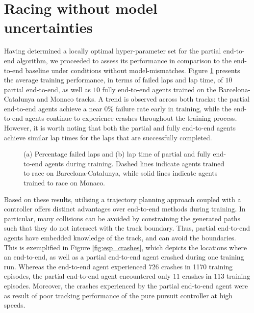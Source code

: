 \section{Racing without model uncertainties}

Having determined a locally optimal hyper-parameter set for the partial end-to-end algorithm, we proceeded to assess its performance in comparison to the end-to-end baseline under conditions without model-mismatches. 
Figure \ref{fig:all_tracks_train} presents the average training performance, in terms of failed laps and lap time, of $10$ partial end-to-end, as well as $10$ fully end-to-end agents trained on the Barcelona-Catalunya and Monaco tracks. 
A trend is observed across both tracks: the partial end-to-end agents achieve a near $0\%$ failure rate early in training, while the end-to-end agents continue to experience crashes throughout the training process.
However, it is worth noting that both the partial and fully end-to-end agents achieve similar lap times for the laps that are successfully completed. 

\begin{figure}[htb!]
    \centering
    
    \caption[Learning curves of partial and fully end-to-end agents trained to race on the Porto and Monaco tracks]{(a) Percentage failed laps and (b) lap time of partial and fully end-to-end agents during training. Dashed lines indicate agents trained to race on Barcelona-Catalunya, while solid lines indicate agents trained to race on Monaco.}
    \label{fig:all_tracks_train}
\end{figure}

Based on these results, utilising a trajectory planning approach coupled with a controller offers distinct advantages over end-to-end methods during training.
In particular, many collisions can be avoided by constraining the generated paths such that they do not intersect with the track boundary. 
Thus, partial end-to-end agents have embedded knowledge of the track, and can avoid the boundaries.
This is exemplified in Figure \ref{fig:esp_crashes}, which depicts the locations where an end-to-end, as well as a partial end-to-end agent crashed during one training run.
Whereas the end-to-end agent experienced 726 crashes in 1170 training episodes, the partial end-to-end agent encountered only 11 crashes in 113 training episodes.
Moreover, the crashes experienced by the partial end-to-end agent were as result of poor tracking performance of the pure pursuit controller at high speeds.


